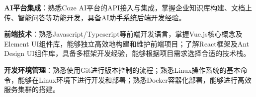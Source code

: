 \item \textbf{AI平台集成}：熟悉Coze AI平台的API接入与集成，掌握企业知识库构建、文档上传、智能问答等功能开发，具备AI助手系统后端开发经验。
\item \textbf{前端技术}：熟悉Javascript/Typescript等前端开发语言，掌握Vue.js核心概念及Element UI组件库，能够独立高效地构建和维护前端项目；了解React框架及Ant Design UI组件库，具备多框架开发经验，能够根据项目需求选择合适的技术栈。
\item \textbf{开发环境管理}：熟悉使用Git进行版本控制的流程；熟悉Linux操作系统的基本命令，能够在Linux环境下进行开发和部署；熟悉Docker容器化部署，能够进行高效服务集群的搭建。